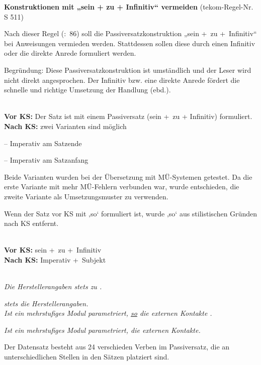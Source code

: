 \begin{description}[font=\normalfont\bfseries]
\item [Beschreibung der KS-Regel:] \textbf{Konstruktionen mit „sein + zu + Infinitiv“ vermeiden} (tekom-Regel-Nr. S 511)

Nach dieser Regel (\citealt{tekom2013}:~86) soll die Passiversatzkonstruktion „sein +~zu +~Infinitiv“ bei Anweisungen vermieden werden. Stattdessen sollen diese durch einen Infinitiv oder die direkte Anrede formuliert werden.

Begründung: Diese Passiversatzkonstruktion ist umständlich und der Leser wird nicht direkt angesprochen. Der Infinitiv bzw. eine direkte Anrede fördert die schnelle und richtige Umsetzung der Handlung (ebd.).

\item[Umsetzungsmuster:]
~\\
\textbf{Vor KS:} Der Satz ist mit einem Passiversatz (sein +~zu + Infinitiv) formuliert.\\
\textbf{Nach KS:} zwei Varianten sind möglich

-- Imperativ am Satzende

-- Imperativ am Satzanfang

Beide Varianten wurden bei der Übersetzung mit MÜ-Systemen getestet. Da die erste Variante mit mehr MÜ-Fehlern verbunden war, wurde entschieden, die zweite Variante als Umsetzungsmuster zu verwenden.

Wenn der Satz vor KS mit ‚so‘ formuliert ist, wurde ‚so‘ aus stilistischen Gründen nach KS entfernt.

\item[KS-Stelle]
~\\
\textbf{Vor KS:} sein +~zu +~Infinitiv\\
\textbf{Nach KS:} Imperativ +~Subjekt\\

\item[Beispiele]
~\\
\textit{Die Herstellerangaben  stets zu .}

\textit{ stets die Herstellerangaben.}
~\\
\textit{Ist ein mehrstufiges Modul parametriert, \ul{so}  die externen Kontakte  .}

\textit{Ist ein mehrstufiges Modul parametriert,  die externen Kontakte.}

\item[Aufteilung der Testsätze:]
Der Datensatz besteht aus 24 verschieden Verben im Passiversatz, die an unterschiedlichen Stellen in den Sätzen platziert sind.

\end{description}

